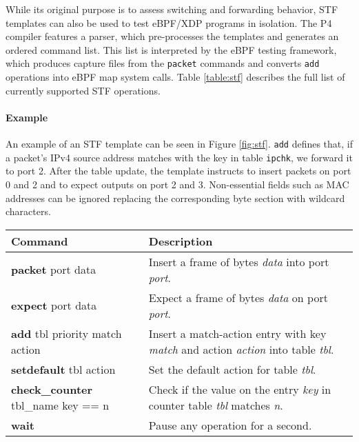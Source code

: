 While its original purpose is to assess switching and forwarding behavior, STF 
templates can also be used to test eBPF/XDP programs in isolation. The P4 
compiler features a parser, which pre-processes the templates and generates an 
ordered command list. This list is interpreted by the eBPF testing framework, 
which produces capture files from the \texttt{packet} commands and converts 
\texttt{add} operations into eBPF map system calls.
Table \ref{table:stf} describes the full list of currently 
supported STF operations.

\paragraph{Example}
An example of an STF template can be seen in Figure \ref{fig:stf}. \texttt{add} 
defines that, if a packet's IPv4 source address matches with the 
key in table \texttt{ipchk}, we forward it to port 2. After the table update, 
the template instructs to insert packets on port 0 and 2 and to expect outputs 
on port 2 and 3. Non-essential fields such as MAC addresses can be ignored 
replacing the corresponding byte section with wildcard characters.


\begin{table*}[h]
	\begin{center}
		\begin{tabular}{|l|p{9cm}|} \hline
			\textbf{Command} & \textbf{Description} \\ \hline \hline
			\textbf{packet} port data & Insert a frame of bytes
			\textit{data} into port \textit{port}.    \\ \hline
			\textbf{expect} port data & Expect a frame of bytes
			\textit{data} on port \textit{port}.  \\ \hline
			\textbf{add} tbl priority match action & Insert a
			match-action entry with key \textit{match} and action
			\textit{action} into table \textit{tbl}. \\ \hline
			\textbf{setdefault} tbl action & Set the default action for table
			\textit{tbl}. \\
			\hline
			\textbf{check\_counter} tbl\_name key == n & Check if the value on
			the entry \textit{key} in counter table \textit{tbl} matches
			\textit{n}.  \\
			\hline
			\textbf{wait} & Pause any operation for a second. \\ \hline
		\end{tabular}
		\caption{The STF command palette.}\label{table:stf}
	\end{center}
\end{table*}

